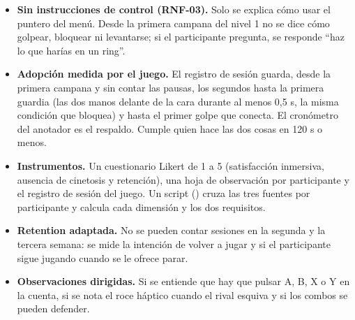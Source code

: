 \begin{itemize}
  \item \textbf{Sin instrucciones de control (RNF-03).} Solo se explica cómo usar el puntero del menú. Desde la primera campana del nivel 1 no se dice cómo golpear, bloquear ni levantarse; si el participante pregunta, se responde ``haz lo que harías en un ring''.
  \item \textbf{Adopción medida por el juego.} El registro de sesión guarda, desde la primera campana y sin contar las pausas, los segundos hasta la primera guardia (las dos manos delante de la cara durante al menos 0,5 s, la misma condición que bloquea) y hasta el primer golpe que conecta. El cronómetro del anotador es el respaldo. Cumple quien hace las dos cosas en 120 s o menos.
  \item \textbf{Instrumentos.} Un cuestionario Likert de 1 a 5 (satisfacción inmersiva, ausencia de cinetosis y retención), una hoja de observación por participante y el registro de sesión del juego. Un script () cruza las tres fuentes por participante y calcula cada dimensión y los dos requisitos.
  \item \textbf{Retention adaptada.} No se pueden contar sesiones en la segunda y la tercera semana: se mide la intención de volver a jugar y si el participante sigue jugando cuando se le ofrece parar.
  \item \textbf{Observaciones dirigidas.} Si se entiende que hay que pulsar A, B, X o Y en la cuenta, si se nota el roce háptico cuando el rival esquiva y si los combos se pueden defender.
\end{itemize}

\begin{table}[H]
\centering
\caption{Resultados de las pruebas HEART (se completa tras las pruebas).}
\end{table}

